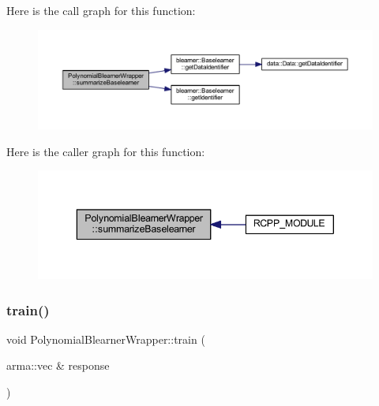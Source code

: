 Here is the call graph for this function\+:\nopagebreak
\begin{figure}[H]
\begin{center}
\leavevmode
\includegraphics[width=350pt]{class_polynomial_blearner_wrapper_ad1eaf84c973c702c999af43fc23aeca2_cgraph}
\end{center}
\end{figure}
Here is the caller graph for this function\+:\nopagebreak
\begin{figure}[H]
\begin{center}
\leavevmode
\includegraphics[width=343pt]{class_polynomial_blearner_wrapper_ad1eaf84c973c702c999af43fc23aeca2_icgraph}
\end{center}
\end{figure}
\mbox{\label{class_polynomial_blearner_wrapper_a7e6cdfd15c354b76ddd217c76b3cfbc5}} 
\subsubsection{\texorpdfstring{train()}{train()}}
{\footnotesize\ttfamily void Polynomial\+Blearner\+Wrapper\+::train (\begin{DoxyParamCaption}\item[{arma\+::vec \&}]{response }\end{DoxyParamCaption})\hspace{0.3cm}{\ttfamily [inline]}}


